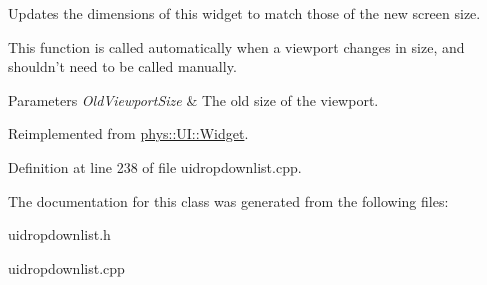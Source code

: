 Updates the dimensions of this widget to match those of the new screen size. 

This function is called automatically when a viewport changes in size, and shouldn't need to be called manually. 
\begin{DoxyParams}{Parameters}
{\em OldViewportSize} & The old size of the viewport. \\
\hline
\end{DoxyParams}


Reimplemented from \hyperlink{classphys_1_1UI_1_1Widget_acbda7003549c6caac46078c034657929}{phys::UI::Widget}.



Definition at line 238 of file uidropdownlist.cpp.



The documentation for this class was generated from the following files:\begin{DoxyCompactItemize}
\item 
uidropdownlist.h\item 
uidropdownlist.cpp\end{DoxyCompactItemize}
